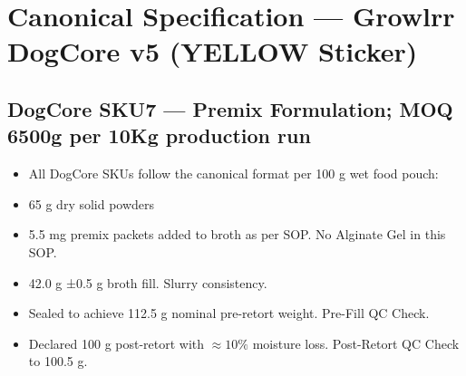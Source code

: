 
\section*{Canonical Specification --- Growlrr DogCore v5 (YELLOW Sticker)}
\subsection*{DogCore SKU7 --- Premix Formulation; MOQ 6500g per 10Kg production run}
\begin{itemize}
\item All DogCore SKUs follow the canonical format per 100 g wet food pouch:
\item 65 g dry solid powders
\item 5.5 mg premix packets added to broth as per SOP. No Alginate Gel in this SOP.
\item 42.0 g ±0.5 g broth fill. Slurry consistency.
\item Sealed to achieve 112.5 g nominal pre-retort weight. Pre-Fill QC Check.
\item Declared 100 g post-retort with $\approx 10\%$ moisture loss. Post-Retort QC Check to 100.5 g.
\end{itemize}

